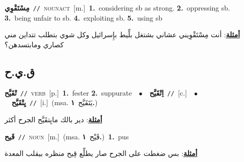 \documentclass[10pt,a4paper,twoside]{article} %
\begin{document}
\begin{multicols}{2}
{\setlength\topsep{0pt}\textbf{\foreignlanguage{arabic}{مِسْتَقْوِي}}\ {\color{gray}\texttt{//}\color{black}}\ \textsc{noun\textunderscore act}\ [m.]\ \textbf{1.}~considering sb as strong.  \textbf{2.}~oppressing sb.  \textbf{3.}~being unfair to sb.  \textbf{4.}~exploiting sb.  \textbf{5.}~using sb\  \begin{flushright}\color{gray}\foreignlanguage{arabic}{\textbf{\underline{\foreignlanguage{arabic}{أمثلة}}}: أنت مِسْتَقْوِيني عشاني بشتغل بلِّيط بإِسرائيل وكل شوي بتطلب تتداين مني كصاري ومابتسدهن؟}\end{flushright}\color{black}} \vspace{2mm}

\vspace{-3mm}
\subsection*{\color{blue}\foreignlanguage{arabic}{ق.ي.ح}\color{blue}{}} 

{\setlength\topsep{0pt}\textbf{\foreignlanguage{arabic}{تْقَيَّح}}\ {\color{gray}\texttt{//}\color{black}}\ \textsc{verb}\ [p.]\ \textbf{1.}~fester  \textbf{2.}~suppurate\ \ $\bullet$\ \ \setlength\topsep{0pt}\textbf{\foreignlanguage{arabic}{اِتْقَيَّح}}\ {\color{gray}\texttt{//}\color{black}}\ [c.]\ \ $\bullet$\ \ \setlength\topsep{0pt}\textbf{\foreignlanguage{arabic}{يِتْقَيَّح}}\ {\color{gray}\texttt{//}\color{black}}\ [i.]\ \color{gray}(msa. \foreignlanguage{arabic}{يَتَقَيَّح}~\foreignlanguage{arabic}{\textbf{١.}})\color{black}\  \begin{flushright}\color{gray}\foreignlanguage{arabic}{\textbf{\underline{\foreignlanguage{arabic}{أمثلة}}}: دير بالك مايِتقَيَّح الجرح أكثر}\end{flushright}\color{black}} \vspace{2mm}

{\setlength\topsep{0pt}\textbf{\foreignlanguage{arabic}{قَيح}}\ {\color{gray}\texttt{//}\color{black}}\ \textsc{noun}\ [m.]\ \color{gray}(msa. \foreignlanguage{arabic}{قَيْح}~\foreignlanguage{arabic}{\textbf{١.}})\color{black}\ \textbf{1.}~pus\  \begin{flushright}\color{gray}\foreignlanguage{arabic}{\textbf{\underline{\foreignlanguage{arabic}{أمثلة}}}: بس ضغطت على الجرح صار يطلِّع قِيح منظره بيقلب المعدة}\end{flushright}\color{black}} \vspace{2mm}


\end{multicols}
\end{document}
